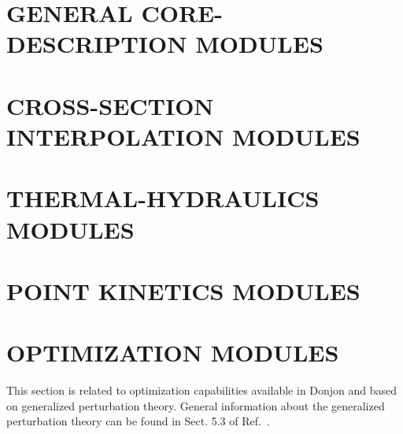 \section{GENERAL CORE-DESCRIPTION MODULES}\label{sect:modesc1}


\vskip 1.0cm

\vskip 1.0cm

\vskip 1.0cm

\vskip 1.0cm

\vskip 1.0cm

\vskip 1.0cm

\vskip 1.0cm

\vskip 1.0cm

\vskip 1.0cm

\vskip 1.0cm

\vskip 1.0cm

\vskip 1.0cm

\vskip 1.0cm

\vskip 1.0cm

\vskip 1.0cm

\vskip 1.0cm

\vskip 1.0cm

\vskip 1.0cm

\vskip 1.0cm


\section{CROSS-SECTION INTERPOLATION MODULES}\label{sect:modesc2}


\vskip 1.0cm

\vskip 1.0cm

\vskip 1.0cm

\vskip 1.0cm

\vskip 1.0cm

\vskip 1.0cm

\vskip 1.0cm

\vskip 1.0cm

\section{THERMAL-HYDRAULICS MODULES}\label{sect:modesc3}



\section{POINT KINETICS MODULES}\label{sect:modesc4}




\section{OPTIMIZATION MODULES}\label{sect:modesc5}

This section is related to optimization capabilities available in Donjon and
based on generalized perturbation theory.\cite{optex1,optex2} General information
about the generalized perturbation theory can be found in Sect. 5.3 of Ref.~.

